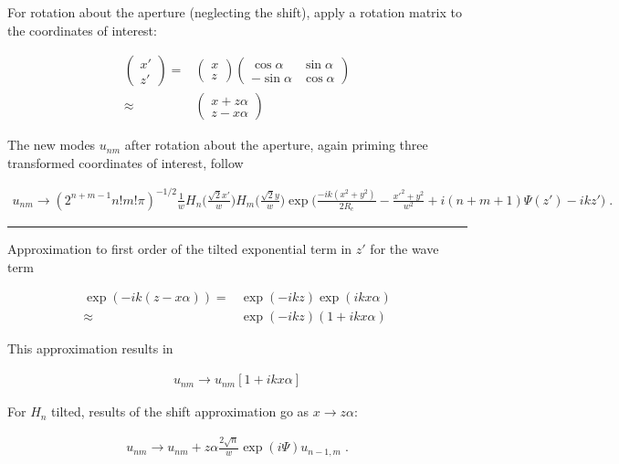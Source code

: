 \documentclass[aps,twoside,secnumarabic,balancelastpage,amsmath,amssymb,nofootinbib,hyperref=pdftex]{revtex4}
\begin{document}
For rotation about the aperture (neglecting the shift), apply a rotation matrix to the coordinates of interest:

\begin{align*}
\begin{pmatrix}
x' \\
z'
\end{pmatrix} 
=&
\begin{pmatrix}
x \\
z
\end{pmatrix} 
\begin{pmatrix}
\cos\alpha & \sin\alpha \\
-\sin\alpha & \cos\alpha
\end{pmatrix}
\\ \approx &
	\begin{pmatrix}
x+z\alpha \\
z - x\alpha
\end{pmatrix}
\end{align*}


The new modes $u_{nm}$ after rotation  about the aperture, again priming three transformed coordinates of interest, follow

\begin{align*}
	u_{nm} \rightarrow
		(2^{n+m-1}n!m!\pi)^{-1/2}
		\frac{1}{w}
		H_{n} \Big(\frac{\sqrt{2}x'}{w} \Big)
		H_{m} \Big(\frac{\sqrt{2}y}{w} \Big)
		\exp \Big(\frac{-ik(x^{2}+y^{2})}{2R_{c}}-
		\frac{x'^{2}+y^{2}}{w^{2}} 
		+i(n+m+1)\Psi(z') - ikz'		
		\Big)\;
		.
\end{align*}

\rule{\textwidth}{0.4pt}

Approximation to first order of the tilted exponential term in $z'$ for the wave term

\begin{align*}
	\exp(-ik(z-x\alpha )) =&
	\exp(-ikz)\exp(ikx\alpha )
	\\ \approx &
	\exp(-ikz)(1+ikx\alpha)
\end{align*}

This approximation results in

\begin{align*}
	u_{nm} \rightarrow
	u_{nm}[1+ikx\alpha ]
\end{align*}

For $H_n$ tilted, results of the shift approximation go as $x \rightarrow z \alpha$:

\begin{align*}
u_{nm} \rightarrow
u_{nm} + 
	z \alpha \frac{2 \sqrt{n}}{w} 
	\exp(i \Psi)
	u_{n-1,m} \; .
\end{align*}
\end{document}
